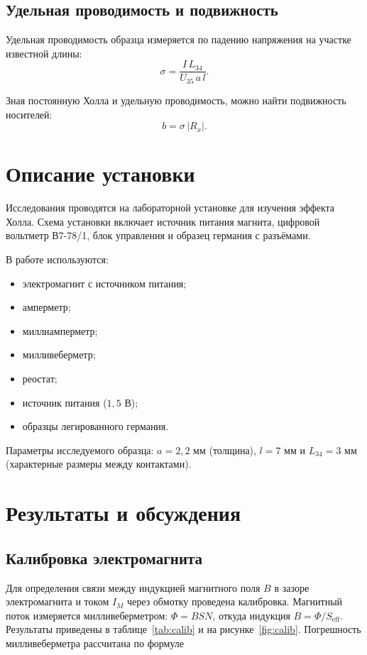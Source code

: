 \documentclass[a4paper,12pt]{article}
\begin{document}
\subsection{Удельная проводимость и подвижность}
Удельная проводимость образца измеряется по падению напряжения на участке известной длины:
\begin{equation}
    \sigma = \frac{I\,L_{34}}{U_{35}\,a\,l}.
\end{equation}

Зная постоянную Холла и удельную проводимость, можно найти подвижность носителей:
\begin{equation}
    b = \sigma\,|R_x| .
\end{equation}

\section{Описание установки}
Исследования проводятся на лабораторной установке для изучения эффекта Холла. Схема установки включает источник питания магнита, цифровой вольтметр В7-78/1, блок управления и образец германия с разъёмами.

В работе используются:
\begin{itemize}
    \item электромагнит с источником питания;
    \item амперметр;
    \item миллиамперметр;
    \item милливеберметр;
    \item реостат;
    \item источник питания ($1{,}5$ В);
    \item образцы легированного германия.
\end{itemize}

Параметры исследуемого образца: $a = 2{,}2$ мм (толщина), $l = 7$ мм и $L_{34} = 3$ мм (характерные размеры между контактами).

\section{Результаты и обсуждения}

\subsection{Калибровка электромагнита}
Для определения связи между индукцией магнитного поля $B$ в зазоре электромагнита и током $I_M$ через обмотку проведена калибровка. Магнитный поток измеряется милливеберметром: $\Phi = B S N$, откуда индукция $B = \Phi / S_{\mathrm{eff}}$. Результаты приведены в таблице~\ref{tab:calib} и на рисунке~\ref{fig:calib}. Погрешность милливеберметра рассчитана по формуле
\end{document}
